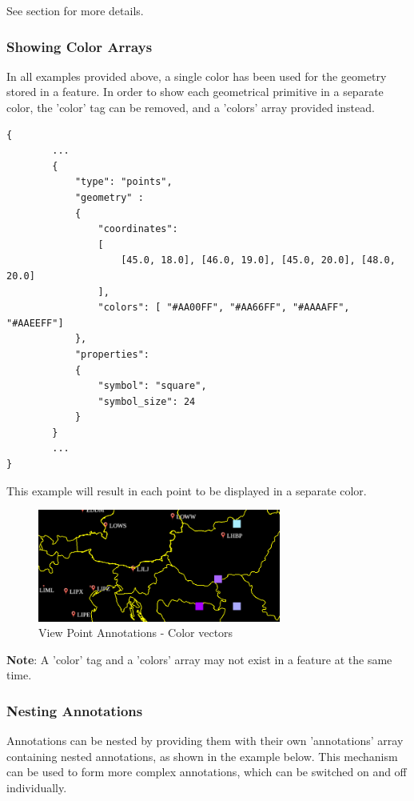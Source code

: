 See section  for more details.

\subsubsection{Showing Color Arrays} In all examples provided above, a single color has been used for the geometry stored in a feature.
In order to show each geometrical primitive in a separate color, the 'color' tag can be removed, and a 'colors' array provided instead.

\begin{lstlisting}[basicstyle=\small\ttfamily]
{
        ...
        {
            "type": "points",
            "geometry" :
            {
                "coordinates": 
                [
                    [45.0, 18.0], [46.0, 19.0], [45.0, 20.0], [48.0, 20.0]
                ],
                "colors": [ "#AA00FF", "#AA66FF", "#AAAAFF", "#AAEEFF"]
            },
            "properties":
            {
                "symbol": "square",
                "symbol_size": 24
            }
        }
        ...
}
\end{lstlisting}

This example will result in each point to be displayed in a separate color.

\begin{figure}[H]
    \center
        \includegraphics[width=8cm]{figures/viewpoints_anno_example_colorvec.png}
    \caption{View Point Annotations - Color vectors} 
\end{figure}

\textbf{Note}: A 'color' tag and a 'colors' array may not exist in a feature at the same time.

\subsubsection{Nesting Annotations} Annotations can be nested by providing them with their own 'annotations' array containing nested 
annotations, as shown in the example below. This mechanism can be used to form more complex annotations, which can be switched on and off 
individually.

